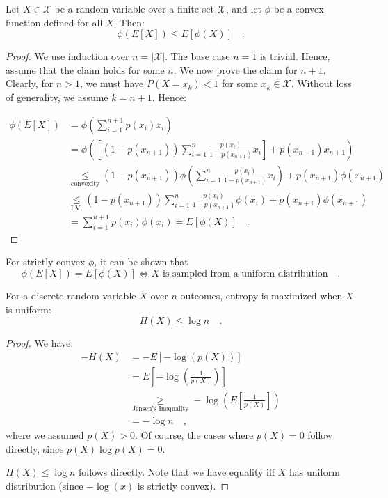 \documentclass[../../main.tex]{subfiles}
\begin{document}
\begin{lemma}
    Let $X \in \mathcal{X}$ be a random variable over a finite set $\mathcal{X}$, and let $\phi$ be a convex function defined for all $X$. Then:
    \[
        \phi(E[X]) \leq E[\phi(X)] \quad .
    \]
\end{lemma}
\begin{proof}
    We use induction over $n = |\mathcal{X}|$. The base case $n = 1$ is trivial. Hence, assume that the claim holds for some $n$. We now prove the claim for $n + 1$. Clearly, for $n > 1$, we must have $P(X = x_k) < 1$ for some $x_k \in \mathcal{X}$. Without loss of generality, we assume $k = n+1$. Hence:

    \begin{align*}
        \phi(E[X]) &= \phi \left( \sum_{i = 1}^{n+1} p(x_i) x_i \right) \\
        &= \phi \left( \left[ (1 - p(x_{n+1})) \sum_{i = 1}^{n} \frac{p(x_i)}{1 - p(x_{n+1})} x_i \right] + p(x_{n+1}) x_{n+1} \right) \\
        &\underset{\text{convexity}}{\leq} (1 - p(x_{n+1})) \phi \left( \sum_{i = 1}^{n} \frac{p(x_i)}{1 - p(x_{n+1})} x_i \right) + p(x_{n+1}) \phi(x_{n+1}) \\
        &\underset{\text{I.V.}}{\leq} (1 - p(x_{n+1})) \sum_{i = 1}^{n} \frac{p(x_i)}{1 - p(x_{n+1})} \phi(x_i) + p(x_{n+1}) \phi(x_{n+1}) \\
        &= \sum_{i = 1}^{n+1} p(x_i) \phi(x_i) = E[\phi(X)] \quad .
    \end{align*}
\end{proof}

\begin{remark}
    For strictly convex $\phi$, it can be shown that
    \[
        \phi(E[X]) = E[\phi(X)] \iff X \text{ is sampled from a uniform distribution} \quad .
    \]
\end{remark}

\begin{proposition}
    For a discrete random variable \( X \) over \( n \) outcomes, entropy is maximized when \( X \) is uniform:
    \[
        H(X) \leq \log n \quad .
    \]
\end{proposition}
\begin{proof}
    We have:
    \begin{align*}
        -H(X) &= -E[-\log(p(X))] \\
        &= E \left[ -\log \left( \frac{1}{p(X)} \right)  \right] \\
        &\underset{\text{Jensen's Inequality}}{\geq} -\log \left( E \left[ \frac{1}{p(X)} \right] \right) \\
        &= -\log n \quad ,
    \end{align*}
    where we assumed $p(X) > 0$. Of course, the cases where $p(X) = 0$ follow directly, since $p(X) \log p(X) = 0$.
    
    $H(X) \leq \log n$ follows directly. Note that we have equality iff $X$ has uniform distribution (since $-\log(x)$ is strictly convex).
\end{proof}
\end{document}
